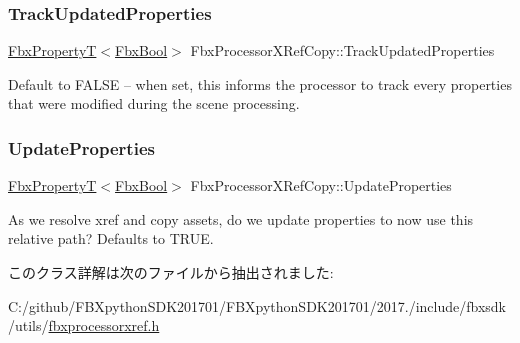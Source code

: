 \subsubsection{\texorpdfstring{Track\+Updated\+Properties}{TrackUpdatedProperties}}
{\footnotesize\ttfamily \hyperlink{class_fbx_property_t}{Fbx\+PropertyT}$<$\hyperlink{fbxtypes_8h_a92e0562b2fe33e76a242f498b362262e}{Fbx\+Bool}$>$ Fbx\+Processor\+X\+Ref\+Copy\+::\+Track\+Updated\+Properties}

Default to F\+A\+L\+SE -- when set, this informs the processor to track every properties that were modified during the scene processing. \mbox{\label{class_fbx_processor_x_ref_copy_a3e375b4793e369ff82265b61d56ebb91}} 
\subsubsection{\texorpdfstring{Update\+Properties}{UpdateProperties}}
{\footnotesize\ttfamily \hyperlink{class_fbx_property_t}{Fbx\+PropertyT}$<$\hyperlink{fbxtypes_8h_a92e0562b2fe33e76a242f498b362262e}{Fbx\+Bool}$>$ Fbx\+Processor\+X\+Ref\+Copy\+::\+Update\+Properties}

As we resolve xref and copy assets, do we update properties to now use this relative path? Defaults to T\+R\+UE. 

このクラス詳解は次のファイルから抽出されました\+:\begin{DoxyCompactItemize}
\item 
C\+:/github/\+F\+B\+Xpython\+S\+D\+K201701/\+F\+B\+Xpython\+S\+D\+K201701/2017./include/fbxsdk/utils/\hyperlink{fbxprocessorxref_8h}{fbxprocessorxref.\+h}\end{DoxyCompactItemize}
